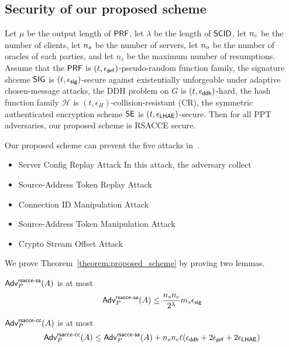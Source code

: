 \subsection{Security of our proposed scheme} \label{sec:quic_proof}



\begin{theorem} \label{theorem:proposed_scheme}
 Let $\mu$ be the output length of $\mathsf{PRF}$, let $\lambda$ be
 the length of $\mathsf{SCID}$, let $n_c$ be the number of
 clients, let $n_s$ be the number of servers, let
 $n_o$ be the number of oracles of each parties, and
 let $n_{\ell}$ be the maximum number of resumptions. Assume
 that the $\mathsf{PRF}$ is $(t, \epsilon_{\mathsf{prf}})$-pseudo-random
 function family, the signature shceme
 $\mathsf{SIG}$ is $(t, \epsilon_{\mathsf{sig}})$-secure against existentially
 unforgeable under adaptive chosen-message attacks, the DDH
 problem on $G$ is $(t, \epsilon_{\mathsf{ddh}})$-hard, the hash
 function family $\mathcal{H}$ is
 $(t,\epsilon_{H})$-collision-resistant (CR), the symmetric
 authenticated encryption scheme $\mathsf{SE}$ is
 $(t, \epsilon_{\mathsf{LHAE}})$-secure.
 Then for all PPT adversaries, our proposed scheme is RSACCE secure.
\end{theorem}

Our proposed scheme can prevent the five attacks in~\cite{LJBN15:QUIC}.

\begin{itemize}
 \item{Server Config Replay Attack}
  In this attack, the adversary collect
 \item{Source-Address Token Replay Attack}
 \item{Connection ID Manipulation Attack}
 \item{Source-Address Token Manipulation Attack}
 \item{Crypto Stream Offset Attack}
\end{itemize}

We prove Theorem~\ref{theorem:proposed_scheme} by proving two lemmas.

\begin{lemma} \label{lemma:proposed_scheme_rsacce-sa}
 $\mathsf{Adv}^{\mathsf{rsacce\textsc{-} sa}}_{P}(A)$ is at most
 \begin{equation}
  \mathsf{Adv}^{\mathsf{rsacce\textsc{-} sa}}_{P}(A) \leq \frac{n_s n_c}{2^{\lambda}} m_s \epsilon_{\mathsf{sig}}
 \end{equation}
\end{lemma}
%


\begin{lemma} \label{lemma:proposed_scheme_rsacce-cc}
 $\mathsf{Adv}^{\mathsf{rsacce\textsc{-} cc}}_{P}(A)$ is at most
 \begin{equation}
  \mathsf{Adv}^{\mathsf{rsacce\textsc{-} cc}}_{P}(A) \leq \mathsf{Adv}^{\mathsf{rsacce\textsc{-} sa}}_{P}(A) + n_sn_c\ell(\epsilon_{\mathsf{ddh}} + 2\epsilon_{\mathsf{prf}} + 2\epsilon_{\mathsf{LHAE}})
 \end{equation}
\end{lemma}
%
